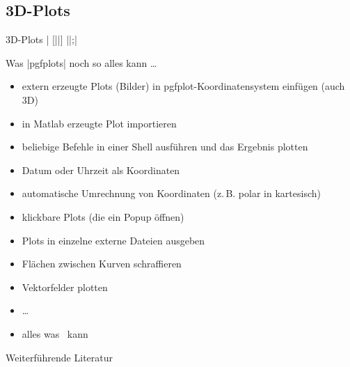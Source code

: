 \documentclass[
	vorläufig=false,
	datum=2017-12-01,
	titel={Diagramme},
	web=false,
	mo,
	aspectratio=1610,
]{../tex/latexkurs-slides}
\begin{document}
\subsection{3D-Plots}
\begin{frame}[fragile,t]{3D-Plots}%
| [||] {||};| \vfill
\begin{LTXexample}[pos=r, explpreset={}, preset=\small, rframe={}]
\end{LTXexample}
\end{frame}






\begin{frame}{Was |pgfplots| noch so alles kann …}
\begin{itemize}
\item extern erzeugte Plots (Bilder) in pgfplot-Koordinatensystem einfügen (auch 3D)
\item in Matlab erzeugte Plot importieren
\item beliebige Befehle in einer Shell ausführen und das Ergebnis plotten
\item Datum oder Uhrzeit als Koordinaten
\item automatische Umrechnung von Koordinaten (z.\,B. polar in kartesisch)
\item klickbare Plots (die ein Popup öffnen)
\item Plots in einzelne externe Dateien ausgeben
\item Flächen zwischen Kurven schraffieren
\item Vektorfelder plotten
\item …
\item alles was \TikZ\ kann
\end{itemize}
\end{frame}

\nocite{pgfplots}
\begin{frame}[allowframebreaks]{Weiterführende Literatur}
\printbibliography
\end{frame}
\end{document}
